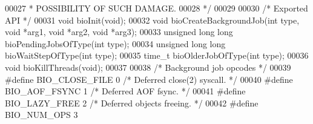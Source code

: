 \begin{DoxyCode}
00027 \textcolor{comment}{ * POSSIBILITY OF SUCH DAMAGE.}
00028 \textcolor{comment}{ */}
00029 
00030 \textcolor{comment}{/* Exported API */}
00031 \textcolor{keywordtype}{void} bioInit(\textcolor{keywordtype}{void});
00032 \textcolor{keywordtype}{void} bioCreateBackgroundJob(\textcolor{keywordtype}{int} type, \textcolor{keywordtype}{void} *arg1, \textcolor{keywordtype}{void} *arg2, \textcolor{keywordtype}{void} *arg3);
00033 \textcolor{keywordtype}{unsigned} \textcolor{keywordtype}{long} \textcolor{keywordtype}{long} bioPendingJobsOfType(\textcolor{keywordtype}{int} type);
00034 \textcolor{keywordtype}{unsigned} \textcolor{keywordtype}{long} \textcolor{keywordtype}{long} bioWaitStepOfType(\textcolor{keywordtype}{int} type);
00035 time\_t bioOlderJobOfType(\textcolor{keywordtype}{int} type);
00036 \textcolor{keywordtype}{void} bioKillThreads(\textcolor{keywordtype}{void});
00037 
00038 \textcolor{comment}{/* Background job opcodes */}
00039 \textcolor{preprocessor}{#}\textcolor{preprocessor}{define} \textcolor{preprocessor}{BIO\_CLOSE\_FILE}    0 \textcolor{comment}{/* Deferred close(2) syscall. */}
00040 \textcolor{preprocessor}{#}\textcolor{preprocessor}{define} \textcolor{preprocessor}{BIO\_AOF\_FSYNC}     1 \textcolor{comment}{/* Deferred AOF fsync. */}
00041 \textcolor{preprocessor}{#}\textcolor{preprocessor}{define} \textcolor{preprocessor}{BIO\_LAZY\_FREE}     2 \textcolor{comment}{/* Deferred objects freeing. */}
00042 \textcolor{preprocessor}{#}\textcolor{preprocessor}{define} \textcolor{preprocessor}{BIO\_NUM\_OPS}       3
\end{DoxyCode}
